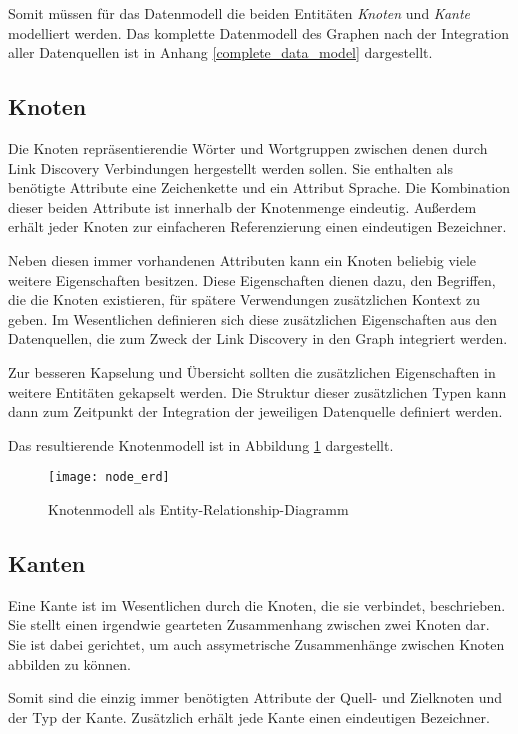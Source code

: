 Somit müssen für das Datenmodell die beiden Entitäten \emph{Knoten} und \emph{Kante} modelliert werden.
Das komplette Datenmodell des Graphen nach der Integration aller Datenquellen ist in Anhang \ref{complete_data_model} dargestellt.

\subsection{Knoten}

Die Knoten repräsentierendie Wörter und Wortgruppen zwischen denen durch Link Discovery Verbindungen hergestellt werden sollen. Sie enthalten als benötigte Attribute eine Zeichenkette und ein Attribut Sprache. Die Kombination dieser beiden Attribute ist innerhalb der Knotenmenge eindeutig. Außerdem erhält jeder Knoten zur einfacheren Referenzierung einen eindeutigen Bezeichner.

Neben diesen immer vorhandenen Attributen kann ein Knoten beliebig viele weitere Eigenschaften besitzen. Diese Eigenschaften dienen dazu, den Begriffen, die die Knoten existieren, für spätere Verwendungen zusätzlichen Kontext zu geben. Im Wesentlichen definieren sich diese zusätzlichen Eigenschaften aus den Datenquellen, die zum Zweck der Link Discovery in den Graph integriert werden.

Zur besseren Kapselung und Übersicht sollten die zusätzlichen Eigenschaften in weitere Entitäten gekapselt werden. Die Struktur dieser zusätzlichen Typen kann dann zum Zeitpunkt der Integration der jeweiligen Datenquelle definiert werden.

Das resultierende Knotenmodell ist in Abbildung \ref{fig:node_erd} dargestellt.

\begin{figure}
\centering
\texttt{[image: node\_erd]}
\caption{Knotenmodell als Entity-Relationship-Diagramm}
\label{fig:node_erd}
\end{figure}

\subsection{Kanten}

Eine Kante ist im Wesentlichen durch die Knoten, die sie verbindet, beschrieben. Sie stellt einen irgendwie gearteten Zusammenhang zwischen zwei Knoten dar. Sie ist dabei gerichtet, um auch assymetrische Zusammenhänge zwischen Knoten abbilden zu können.

Somit sind die einzig immer benötigten Attribute der Quell- und Zielknoten und der Typ der Kante. Zusätzlich erhält jede Kante einen eindeutigen Bezeichner.

